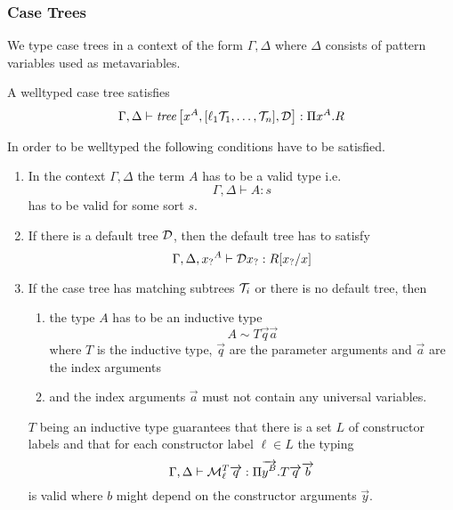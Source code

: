\subsubsection{Case Trees}

We type case trees in a context of the form $\Gamma, \Delta$ where $\Delta$
consists of pattern variables used as metavariables.

A welltyped case tree satisfies
$$
    \Gamma, \Delta
    \vdash
    {{\text{\it tree}}\left[ {
        x^A,
        [\ell_1 {\mathcal T}_1, \ldots, {\mathcal T}_n],
        {\mathcal D}
    } \right]}
    : \Pi x^A. R
$$

In order to be welltyped the following conditions have to be satisfied.

\begin{enumerate}

    \item In the context $\Gamma,\Delta$ the term $A$ has to be a valid type
        i.e.
        $$
        \Gamma,\Delta
        \vdash
        A: s
        $$
        has to be valid for some sort $s$.

    \item If there is a default tree ${\mathcal D}$, then the default tree has to
        satisfy
        $$
        \Gamma, \Delta, {x_?}^A
        \vdash
        {\mathcal D} {x_?} : R[{x_?} / x]
        $$


    \item If the case tree has matching subtrees ${\mathcal T}_i$ or there is no
        default tree, then

        \begin{enumerate}

            \item
                the type $A$ has to be an inductive type
                $$
                A \sim T \vec q \vec a
                $$
                where $T$ is the inductive type, $\vec q$ are the parameter
                arguments and $\vec a$ are the index arguments

            \item and the index arguments $\vec a$ must not contain any universal
                variables.

        \end{enumerate}

        $T$ being an inductive type guarantees that there is a set $L$ of
        constructor labels and that for each constructor label
        $\ell \in L$ the typing
        $$
        \Gamma, \Delta
        \vdash
        {\cal M}_\ell^T {\overrightarrow {q}}
        :
        \Pi {\overrightarrow {y^B}}. T {\overrightarrow {q}} {\overrightarrow {b}}
        $$
        is valid where $b$ might depend on the constructor arguments $\vec y$.


\end{enumerate}
